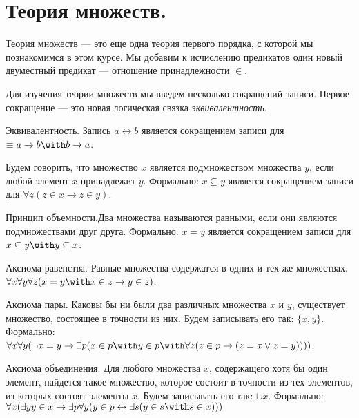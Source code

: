 \section{Теория множеств.}

Теория множеств --- это еще одна теория первого порядка, с которой
мы познакомимся в этом курсе.
Мы добавим к исчислению предикатов один новый двуместный предикат --- отношение 
принадлежности $\in$. 

Для изучения теории множеств мы введем несколько сокращений записи.
Первое сокращение --- это новая логическая связка \emph{эквивалентность}. 

\begin{definition}{Эквивалентность.}
Запись $a \leftrightarrow b$ является сокращением записи для 
$ \equiv a \rightarrow b \with b \rightarrow a$.
\end{definition}

\begin{definition}Будем говорить, что множество $x$ является подмножеством
множества $y$, если любой элемент $x$ принадлежит $y$. 
Формально: $x \subseteq y$ является сокращением записи для
$\forall z (z \in x \rightarrow z \in y)$.
\end{definition}

\begin{definition}{Принцип объемности.}Два множества называются
равными, если они являются подмножествами друг друга. Формально:
$x = y$ является сокращением записи для $x \subseteq y \with y \subseteq x$.
\end{definition}

\begin{axiom}{Аксиома равенства.}
Равные множества содержатся в одних и тех же множествах. 
$\forall x \forall y \forall z (x = y \with x \in z \rightarrow y \in z)$.
\end{axiom}

\begin{axiom}{Аксиома пары.}
Каковы бы ни были два различных множества $x$ и $y$, существует множество, состоящее 
в точности из них. Будем записывать его так: $\{x,y\}$.
Формально: 
$\forall x \forall y (\neg x=y \rightarrow \exists p (x \in p \with y \in p \with \forall z (z \in p \rightarrow (z = x \vee z = y))))$.
\end{axiom}

\begin{axiom}{Аксиома объединения.}
Для любого множества $x$, содержащего хотя бы один элемент, найдется такое множество, которое состоит в точности
из тех элементов, из которых состоят элементы $x$. Будем записывать его так: $\cup x$.
Формально: $\forall x (\exists y y \in x \rightarrow \exists p \forall y (y \in p \leftrightarrow \exists s (y \in s \with s \in x)))$
\end{axiom}


